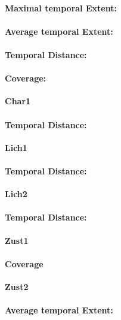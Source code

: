 \paragraph{Maximal temporal Extent:}
\paragraph{Average temporal Extent:}
\paragraph{Temporal Distance:}
\paragraph{Coverage:}

\large
\centerline{\textbf{Char1}}
\normalsize

\paragraph{Temporal Distance:}

\large
\centerline{\textbf{Lich1}}
\normalsize

\paragraph{Temporal Distance:}

\large
\centerline{\textbf{Lich2}}
\normalsize

\paragraph{Temporal Distance:}

\large
\centerline{\textbf{Zust1}}
\normalsize

\paragraph{Coverage}

\large
\centerline{\textbf{Zust2}}
\normalsize

\paragraph{Average temporal Extent:}
